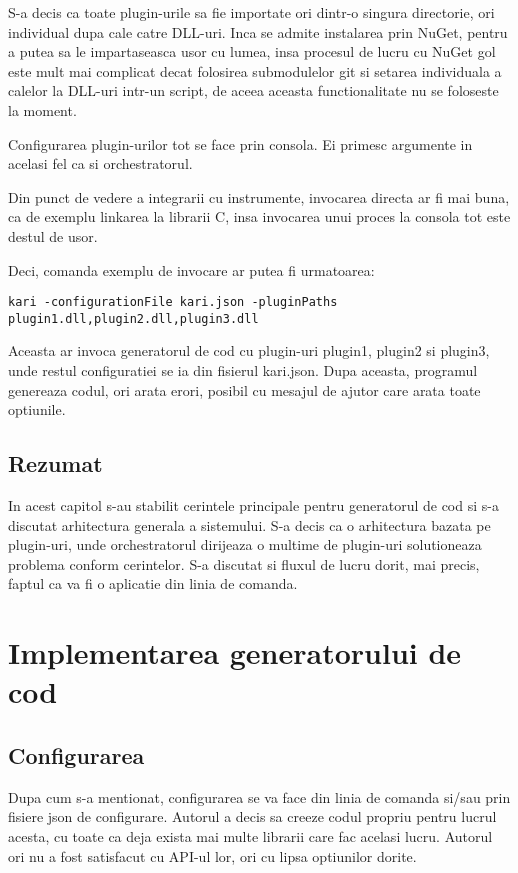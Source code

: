 \documentclass{report}
\begin{document}
S-a decis ca toate plugin-urile sa fie importate ori dintr-o singura
directorie, ori individual dupa cale catre DLL-uri. Inca se admite
instalarea prin NuGet, pentru a putea sa le impartaseasca usor cu lumea,
insa procesul de lucru cu NuGet gol este mult mai complicat decat
folosirea submodulelor git si setarea individuala a calelor la DLL-uri
intr-un script, de aceea aceasta functionalitate nu se foloseste la
moment.

Configurarea plugin-urilor tot se face prin consola. Ei primesc
argumente in acelasi fel ca si orchestratorul.

Din punct de vedere a integrarii cu instrumente, invocarea directa ar fi
mai buna, ca de exemplu linkarea la librarii C, insa invocarea unui
proces la consola tot este destul de usor.

Deci, comanda exemplu de invocare ar putea fi urmatoarea:

\begin{verbatim}
kari -configurationFile kari.json -pluginPaths plugin1.dll,plugin2.dll,plugin3.dll
\end{verbatim}

Aceasta ar invoca generatorul de cod cu plugin-uri plugin1, plugin2 si
plugin3, unde restul configuratiei se ia din fisierul kari.json. Dupa
aceasta, programul genereaza codul, ori arata erori, posibil cu mesajul
de ajutor care arata toate optiunile.

\section{Rezumat}

In acest capitol s-au stabilit cerintele principale pentru generatorul
de cod si s-a discutat arhitectura generala a sistemului. S-a decis ca o
arhitectura bazata pe plugin-uri, unde orchestratorul dirijeaza o
multime de plugin-uri solutioneaza problema conform cerintelor. S-a
discutat si fluxul de lucru dorit, mai precis, faptul ca va fi o
aplicatie din linia de comanda.


\chapter{Implementarea generatorului de cod}

\section{Configurarea}

Dupa cum s-a mentionat, configurarea se va face din linia de comanda
si/sau prin fisiere json de configurare. Autorul a decis sa creeze codul
propriu pentru lucrul acesta, cu toate ca deja exista mai multe librarii
care fac acelasi lucru. Autorul ori nu a fost satisfacut cu API-ul lor,
ori cu lipsa optiunilor dorite.
\end{document}
